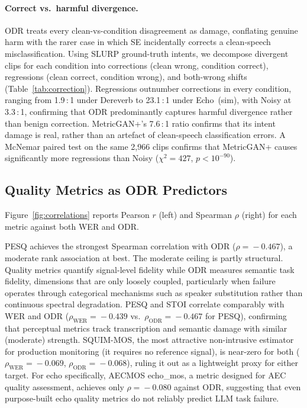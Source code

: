 \documentclass[11pt]{article}
\begin{document}
\paragraph{Correct vs.\ harmful divergence.}
ODR treats every clean-vs-condition disagreement as damage, conflating
genuine harm with the rarer case in which SE incidentally corrects a
clean-speech misclassification. Using SLURP ground-truth intents, we
decompose divergent clips for each condition into corrections (clean
wrong, condition correct), regressions (clean correct, condition
wrong), and both-wrong shifts (Table~\ref{tab:correction}). Regressions outnumber corrections in
every condition, ranging from 1.9\,:\,1 under Dereverb to
23.1\,:\,1 under Echo~(sim), with Noisy at 3.3\,:\,1, confirming
that ODR predominantly captures harmful divergence rather than
benign correction. MetricGAN{+}'s 7.6\,:\,1
ratio confirms that its intent damage is real, rather than an artefact
of clean-speech classification errors. A McNemar paired test on the
same 2{,}966 clips confirms that MetricGAN{+} causes significantly
more regressions than Noisy ($\chi^2\!=\!427$, $p\!<\!10^{-90}$).



\subsection{Quality Metrics as ODR Predictors}

Figure~\ref{fig:correlations} reports Pearson $r$ (left) and
Spearman $\rho$ (right) for each metric against both WER and ODR.

PESQ achieves the strongest Spearman correlation with ODR
($\rho\!=\!-0.467$), a moderate rank association at best.
The moderate ceiling is partly structural. Quality metrics quantify
signal-level fidelity while ODR measures semantic task fidelity,
dimensions that are only loosely coupled, particularly when failure
operates through categorical mechanisms such as speaker substitution
rather than continuous spectral degradation.
PESQ and STOI correlate comparably with WER and ODR
($\rho_{\text{WER}}\!=\!-0.439$ vs.\ $\rho_{\text{ODR}}\!=\!-0.467$
for PESQ), confirming that perceptual metrics track transcription
and semantic damage with similar (moderate) strength.
SQUIM-MOS, the most attractive non-intrusive estimator for production
monitoring (it requires no reference signal), is near-zero for both
($\rho_{\text{WER}}\!=\!-0.069$, $\rho_{\text{ODR}}\!=\!-0.068$),
ruling it out as a lightweight proxy for either target.
For echo specifically, AECMOS echo\_mos, a metric designed for
AEC quality assessment, achieves only $\rho\!=\!-0.080$ against
ODR, suggesting that even purpose-built echo quality metrics do not
reliably predict LLM task failure.
\end{document}
